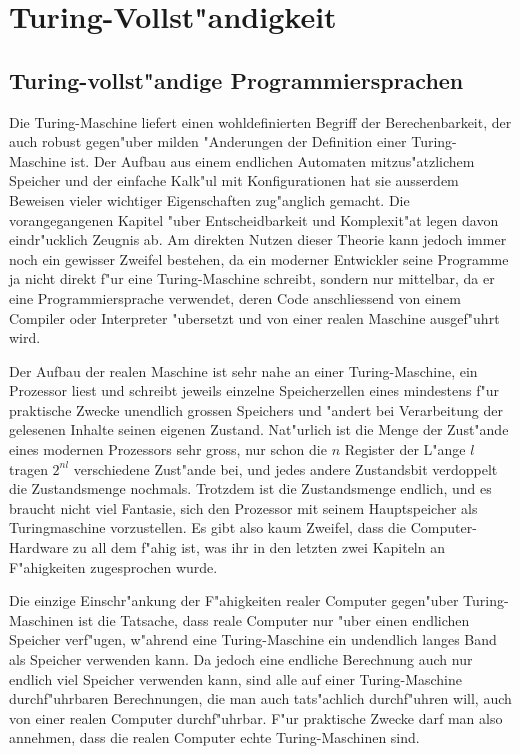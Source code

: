 %
%
%
\chapter{Turing-Vollst"andigkeit}
\section{Turing-vollst"andige Programmiersprachen}
Die Turing-Maschine liefert einen wohldefinierten Begriff der
Berechenbarkeit, der auch robust gegen"uber milden "Anderungen
der Definition einer Turing-Maschine ist.
Der Aufbau aus einem endlichen Automaten mitzus"atzlichem
Speicher und der einfache Kalk"ul mit Konfigurationen hat
sie ausserdem Beweisen vieler wichtiger Eigenschaften zug"anglich
gemacht. Die vorangegangenen Kapitel "uber Entscheidbarkeit und
Komplexit"at legen davon eindr"ucklich Zeugnis ab. Am direkten
Nutzen dieser Theorie kann jedoch immer noch ein gewisser Zweifel
bestehen, da ein moderner Entwickler seine Programme ja nicht
direkt f"ur eine Turing-Maschine schreibt, sondern nur mittelbar,
da er eine Programmiersprache verwendet, deren Code anschliessend
von einem Compiler oder Interpreter "ubersetzt und von einer realen
Maschine ausgef"uhrt wird.

Der Aufbau der realen Maschine ist sehr 
nahe an einer Turing-Maschine, ein Prozessor liest und schreibt
jeweils einzelne
Speicherzellen eines mindestens f"ur praktische Zwecke unendlich
grossen Speichers und "andert bei Verarbeitung der gelesenen
Inhalte seinen eigenen Zustand. Nat"urlich ist die Menge der
Zust"ande eines modernen Prozessors sehr gross, nur schon die $n$
Register der L"ange $l$ tragen $2^{nl}$ verschiedene Zust"ande bei,
und jedes andere Zustandsbit verdoppelt die Zustandsmenge nochmals.
Trotzdem ist die Zustandsmenge endlich, und es braucht nicht viel
Fantasie, sich den Prozessor mit seinem Hauptspeicher als Turingmaschine
vorzustellen. Es gibt also kaum Zweifel, dass die Computer-Hardware
zu all dem f"ahig ist, was ihr in den letzten zwei Kapiteln an
F"ahigkeiten zugesprochen wurde.

Die einzige Einschr"ankung der F"ahigkeiten realer Computer gegen"uber
Turing-Maschinen ist
die Tatsache, dass reale Computer nur "uber einen endlichen Speicher
verf"ugen, w"ahrend eine Turing-Maschine ein undendlich langes Band
als Speicher verwenden kann. Da jedoch eine endliche Berechnung auch
nur endlich viel Speicher verwenden kann, sind alle auf einer Turing-Maschine
durchf"uhrbaren Berechnungen, die man auch tats"achlich durchf"uhren
will, auch von einer realen Computer durchf"uhrbar. F"ur praktische
Zwecke darf man also annehmen, dass die realen Computer echte Turing-Maschinen
sind.

